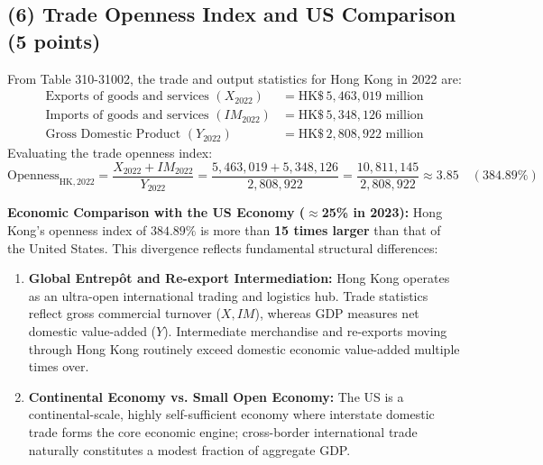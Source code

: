 \documentclass[11pt,a4paper]{article}
\begin{document}
\subsection*{(6) Trade Openness Index and US Comparison (5 points)}
From Table 310-31002, the trade and output statistics for Hong Kong in 2022 are:
\begin{align}
    \text{Exports of goods and services } (X_{2022}) &= \text{HK\$} \, 5,463,019 \text{ million} \\
    \text{Imports of goods and services } (IM_{2022}) &= \text{HK\$} \, 5,348,126 \text{ million} \\
    \text{Gross Domestic Product } (Y_{2022}) &= \text{HK\$} \, 2,808,922 \text{ million}
\end{align}
Evaluating the trade openness index:
\begin{equation}
    \text{Openness}_{\mathrm{HK}, 2022} = \frac{X_{2022} + IM_{2022}}{Y_{2022}} = \frac{5,463,019 + 5,348,126}{2,808,922} = \frac{10,811,145}{2,808,922} \approx \mathbf{3.85} \quad (\mathbf{384.89\%})
\end{equation}

\textbf{Economic Comparison with the US Economy ($\approx$25\% in 2023):}
Hong Kong's openness index of $\mathbf{384.89\%}$ is more than \textbf{15 times larger} than that of the United States. This divergence reflects fundamental structural differences:
\begin{enumerate}
    \item \textbf{Global Entrep\^ot and Re-export Intermediation:} Hong Kong operates as an ultra-open international trading and logistics hub. Trade statistics reflect gross commercial turnover ($X, IM$), whereas GDP measures net domestic value-added ($Y$). Intermediate merchandise and re-exports moving through Hong Kong routinely exceed domestic economic value-added multiple times over.
    \item \textbf{Continental Economy vs. Small Open Economy:} The US is a continental-scale, highly self-sufficient economy where interstate domestic trade forms the core economic engine; cross-border international trade naturally constitutes a modest fraction of aggregate GDP.
\end{enumerate}
\end{document}
